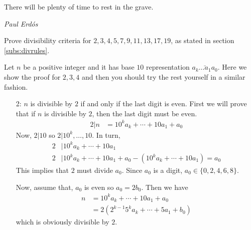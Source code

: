 \documentclass[problems.tex]{subfile}
\begin{document}
	\epigraph{There will be plenty of time to rest in the grave.}{\textit{Paul Erd\'{o}s}}
	

	\begin{problem}
		Prove divisibility criteria for $2,3,4,5,7,9,11,13,17,19$, as stated in section \eqref{subs:divrules}\watermark.
	\end{problem}
	
	\begin{solution}
		Let $n$ be a positive integer and it has base $10$ representation $\bar{a_k\ldots a_1a_0}$. Here we show the proof for $2,3,4$ and then you should try the rest yourself in a similar fashion.
			\begin{enumerate}
				\item[2:] $n$ is divisible by $2$ if and only if the last digit is even. First we will prove that if $n$ is divisible by $2$, then the last digit must be even.
						\begin{align*}
							2|n & = 10^ka_k+\cdots+10a_1+a_0
						\end{align*}
					Now, $2|10$ so $2|10^k,\ldots,10$. In turn,
						\begin{align*}
							2 & |10^ka_k+\cdots+10a_1\\
							2 & |10^ka_k+\cdots+10a_1+a_0-(10^ka_k+\cdots+10a_1)=a_0
						\end{align*}
					This implies that $2$ must divide $a_0$. Since $a_0$ is a digit, $a_0\in\{0,2,4,6,8\}$.
					
					Now, assume that, $a_0$ is even so $a_0=2b_0$. Then we have
						\begin{align*}
							n & = 10^ka_k+\cdots+10a_1+a_0\\
							  & = 2(2^{k-1}5^ka_k+\cdots+5a_1+b_0)
						\end{align*}
					which is obviously divisible by $2$.
					

\end{enumerate}
\end{solution}
\end{document}
